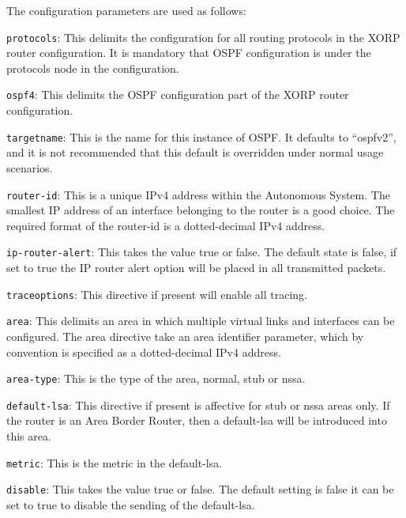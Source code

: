 \noindent
The configuration parameters are used as follows:
\begin{description}
\item{\tt protocols}: This delimits the configuration for all routing
  protocols in the XORP router configuration.  It is mandatory that
  OSPF configuration is under the {\stt protocols} node in the
  configuration.
\item{\tt ospf4}: This delimits the OSPF configuration part of the XORP
  router configuration.
\item{\tt targetname}: This is the name for this instance of OSPF.  It
  defaults to ``{\stt ospfv2}'', and it is not recommended that this
  default is overridden under normal usage scenarios.
\item{\tt router-id}: This is a unique IPv4 address within the
Autonomous System. The smallest IP address of an interface belonging
to the router is a good choice. The required format of the {\stt
router-id} is a dotted-decimal IPv4 address.
\item{\tt ip-router-alert}: This takes the value {\stt true} or {\stt
false}. The default state is {\stt false}, if set to {\stt true} the
IP router alert option will be placed in all transmitted packets.
\item{\tt traceoptions}: This directive if present will enable all tracing.
\item{\tt area}: This delimits an area in which multiple virtual links
and interfaces can be configured. The {\stt area} directive take an
area identifier parameter, which by convention is specified as a
dotted-decimal IPv4 address.
\begin{description}

\item{\tt area-type}: This is the type of the area, {\stt normal},
{\stt stub} or {\stt nssa}.

\item{\tt default-lsa}: This directive if present is affective for
{\stt stub} or {\stt nssa} areas only. If the router is an Area Border
Router, then a default-lsa will be introduced into this area.
\begin{description}
\item{\tt metric}: This is the metric in the default-lsa.
\item{\tt disable}: This takes the value {\stt true} or {\stt
false}. The default setting is {\stt false} it can be set to {\stt
true} to disable the sending of the default-lsa.
\end{description}
\end{description}
\begin{description}


\end{description}
\end{description}
